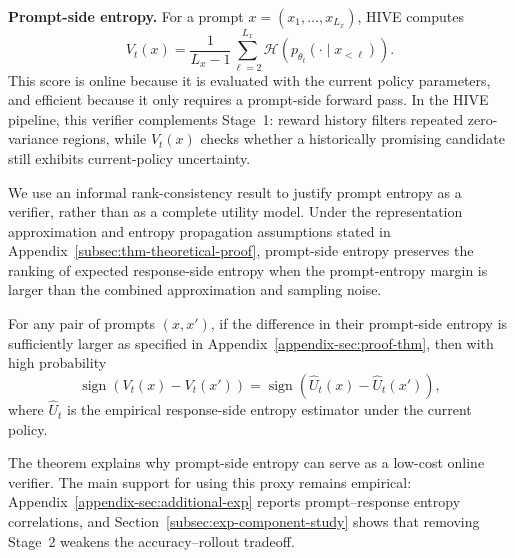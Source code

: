 \textbf{Prompt-side entropy.}
For a prompt $x=(x_1,\ldots,x_{L_x})$, HIVE computes
\begin{equation}
\label{eq:prompt_entropy}
V_t(x)
=
\frac{1}{L_x-1}\sum_{\ell=2}^{L_x}
\mathcal{H}\!\left(p_{\theta_t}(\cdot\mid x_{<\ell})\right).
\end{equation}
This score is online because it is evaluated with the current policy parameters, and efficient because it only requires a prompt-side forward pass. In the HIVE pipeline, this verifier complements Stage~1: reward history filters repeated zero-variance regions, while $V_t(x)$ checks whether a historically promising candidate still exhibits current-policy uncertainty.

We use an informal rank-consistency result to justify prompt entropy as a verifier, rather than as a complete utility model. Under the representation approximation and entropy propagation assumptions stated in Appendix~\ref{subsec:thm-theoretical-proof}, prompt-side entropy preserves the ranking of expected response-side entropy when the prompt-entropy margin is larger than the combined approximation and sampling noise.
\begin{theorem}
\label{thm:ranking-informal}
For any pair of prompts $(x,x')$, if the difference in their prompt-side entropy is sufficiently larger as specified in Appendix~\ref{appendix-sec:proof-thm}, then with high probability
\begin{equation}
\operatorname{sign}\!\left(V_t(x)-V_t(x')\right)
=
\operatorname{sign}\!\left(\hat{U}_t(x)-\hat{U}_t(x')\right),
\end{equation}
where $\hat{U}_t$ is the empirical response-side entropy estimator under the current policy.
\end{theorem}
The theorem explains why prompt-side entropy can serve as a low-cost online verifier. The main support for using this proxy remains empirical: Appendix~\ref{appendix-sec:additional-exp} reports prompt--response entropy correlations, and Section~\ref{subsec:exp-component-study} shows that removing Stage~2 weakens the accuracy--rollout tradeoff.

